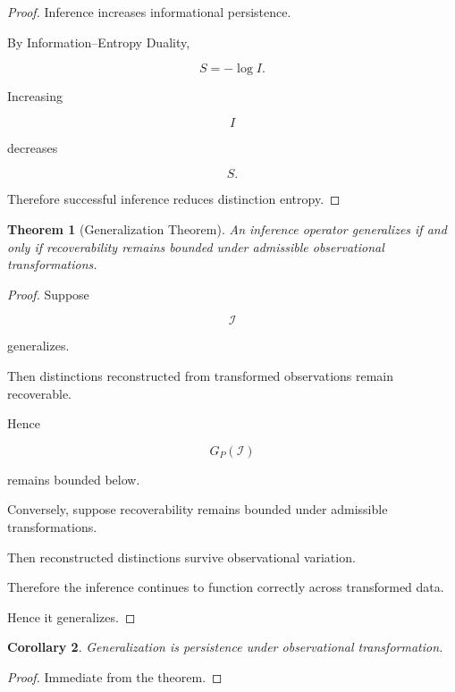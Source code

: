 \documentclass[12pt,oneside]{article}
\newtheorem{theorem}{Theorem}[section] \newtheorem{lemma}[theorem]{Lemma} \newtheorem{proposition}[theorem]{Proposition} \newtheorem{corollary}[theorem]{Corollary}
\theoremstyle{definition}
\begin{document}
\begin{proof}

Inference increases informational persistence.

By Information–Entropy Duality,

\[
S
=
-\log I.
\]

Increasing

\[
I
\]

decreases

\[
S.
\]

Therefore successful inference reduces distinction entropy.

\end{proof}

\begin{theorem}[Generalization Theorem]

An inference operator generalizes if and only if recoverability remains bounded under admissible observational transformations.

\end{theorem}

\begin{proof}

Suppose

\[
\mathcal I
\]

generalizes.

Then distinctions reconstructed from transformed observations remain recoverable.

Hence

\[
G_P(\mathcal I)
\]

remains bounded below.

Conversely, suppose recoverability remains bounded under admissible transformations.

Then reconstructed distinctions survive observational variation.

Therefore the inference continues to function correctly across transformed data.

Hence it generalizes.

\end{proof}

\begin{corollary}

Generalization is persistence under observational transformation.

\end{corollary}

\begin{proof}

Immediate from the theorem.

\end{proof}
\end{document}
